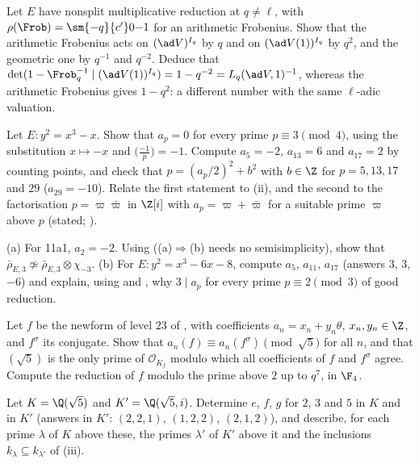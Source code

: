 \begin{exercise}\label{ex:ant:ex-signs}
Let $E$ have nonsplit multiplicative reduction at $q\ne\ell$, with $\rho(\Frob)=\sm{-q}{c'}0{-1}$ for an arithmetic Frobenius. Show that the arithmetic Frobenius
acts on $(\ad V)^{I_q}$ by $q$ and on $(\ad V(1))^{I_q}$ by $q^2$, and the geometric one by $q^{-1}$ and $q^{-2}$. Deduce that
$\det(1-\Frob_q^{-1}\mid(\ad V(1))^{I_q})=1-q^{-2}=L_q(\ad V,1)^{-1}$, whereas the arithmetic Frobenius gives $1-q^2$: a different number with the same $\ell$-adic
valuation.
\end{exercise}

\begin{exercise}\label{ex:ant:ex-cm}
Let $E\colon y^2=x^3-x$. Show that $a_p=0$ for every prime $p\equiv3\pmod4$, using the substitution $x\mapsto-x$ and $\bigl(\frac{-1}p\bigr)=-1$. Compute $a_5=-2$,
$a_{13}=6$ and $a_{17}=2$ by counting points, and check that $p=(a_p/2)^2+b^2$ with $b\in\Z$ for $p=5,13,17$ and $29$ ($a_{29}=-10$). Relate the first statement to
(ii), and the second to the factorisation $p=\varpi\bar\varpi$ in $\Z[i]$ with $a_p=\varpi+\bar\varpi$ for a suitable prime $\varpi$ above $p$ (stated;
).
\end{exercise}

\begin{exercise}\label{ex:ant:ex-twist}
(a) For 11a1, $a_2=-2$. Using  ((a)$\Rightarrow$(b) needs no semisimplicity), show that $\bar\rho_{E,3}\not\simeq\bar\rho_{E,3}\otimes\chi_{-3}$.
(b) For $E\colon y^2=x^3-6x-8$, compute $a_5$, $a_{11}$, $a_{17}$ (answers $3$, $3$, $-6$) and explain, using  and , why $3\mid a_p$
for every prime $p\equiv2\pmod3$ of good reduction.
\end{exercise}

\begin{exercise}\label{ex:ant:ex-level23}
Let $f$ be the newform of level $23$ of , with coefficients $a_n=x_n+y_n\theta$, $x_n,y_n\in\Z$, and $f^\sigma$ its conjugate. Show that
$a_n(f)\equiv a_n(f^\sigma)\pmod{\sqrt5}$ for all $n$, and that $(\sqrt5)$ is the only prime of $\mathcal O_{K_f}$ modulo which all coefficients of $f$ and $f^\sigma$
agree. Compute the reduction of $f$ modulo the prime above $2$ up to $q^7$, in $\F_4$.
\end{exercise}

\begin{exercise}\label{ex:ant:ex-enlarge}
Let $K=\Q(\sqrt5)$ and $K'=\Q(\sqrt5,i)$. Determine $e$, $f$, $g$ for $2$, $3$ and $5$ in $K$ and in $K'$ (answers in $K'$: $(2,2,1)$, $(1,2,2)$, $(2,1,2)$), and describe,
for each prime $\lambda$ of $K$ above these, the primes $\lambda'$ of $K'$ above it and the inclusions $k_\lambda\subseteq k_{\lambda'}$ of (iii).
\end{exercise}

